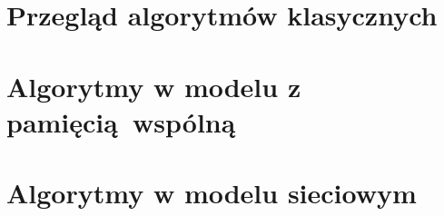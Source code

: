 \section{Przegląd algorytmów klasycznych}


\section{Algorytmy w modelu z pamięcią wspólną}


\section{Algorytmy w modelu sieciowym}


